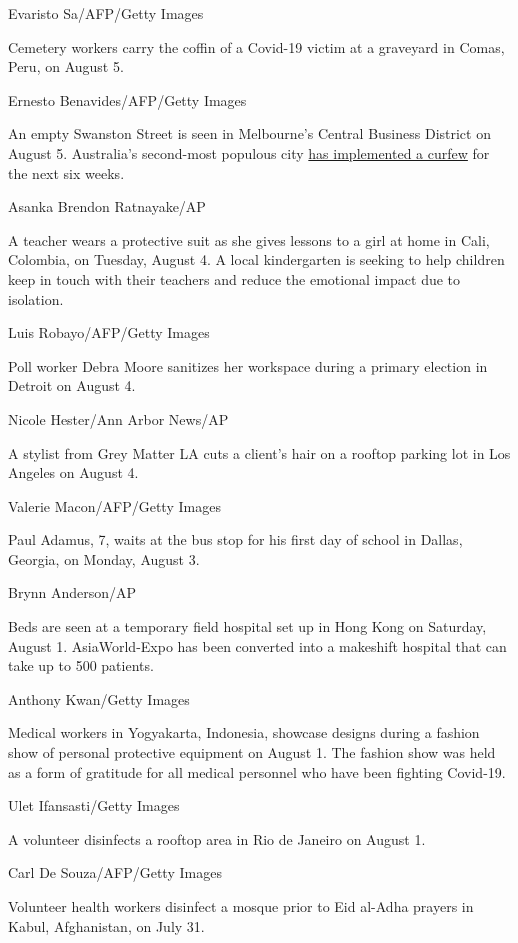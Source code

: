Evaristo Sa/AFP/Getty Images

Cemetery workers carry the coffin of a Covid-19 victim at a graveyard in
Comas, Peru, on August 5.

Ernesto Benavides/AFP/Getty Images

An empty Swanston Street is seen in Melbourne's Central Business
District on August 5. Australia's second-most populous city
\href{https://www.cnn.com/2020/08/03/australia/australia-melbourne-coronavirus-intl-hnk/index.html}{has
implemented a curfew} for the next six weeks.

Asanka Brendon Ratnayake/AP

A teacher wears a protective suit as she gives lessons to a girl at home
in Cali, Colombia, on Tuesday, August 4. A local kindergarten is seeking
to help children keep in touch with their teachers and reduce the
emotional impact due to isolation.

Luis Robayo/AFP/Getty Images

Poll worker Debra Moore sanitizes her workspace during a primary
election in Detroit on August 4.

Nicole Hester/Ann Arbor News/AP

A stylist from Grey Matter LA cuts a client's hair on a rooftop parking
lot in Los Angeles on August 4.

Valerie Macon/AFP/Getty Images

Paul Adamus, 7, waits at the bus stop for his first day of school in
Dallas, Georgia, on Monday, August 3.

Brynn Anderson/AP

Beds are seen at a temporary field hospital set up in Hong Kong on
Saturday, August 1. AsiaWorld-Expo has been converted into a makeshift
hospital that can take up to 500 patients.

Anthony Kwan/Getty Images

Medical workers in Yogyakarta, Indonesia, showcase designs during a
fashion show of personal protective equipment on August 1. The fashion
show was held as a form of gratitude for all medical personnel who have
been fighting Covid-19.

Ulet Ifansasti/Getty Images

A volunteer disinfects a rooftop area in Rio de Janeiro on August 1.

Carl De Souza/AFP/Getty Images

Volunteer health workers disinfect a mosque prior to Eid al-Adha prayers
in Kabul, Afghanistan, on July 31.


